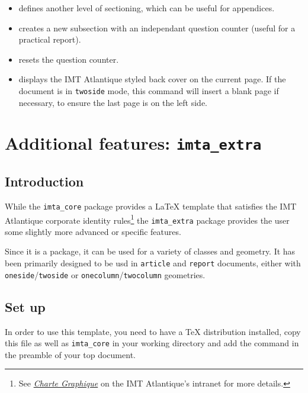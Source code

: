 \documentclass{report}
\begin{document}
\begin{itemize}
    \item {} defines another level of sectioning, which can be useful for appendices.
    
    \item {} creates a new subsection with an independant question counter (useful for a practical report).
    
    \item {} resets the question counter.
    
    \item {} displays the IMT Atlantique styled back cover on the current page. If the document is in \texttt{twoside} mode, this command will insert a blank page if necessary, to ensure the last page is on the left side.
\end{itemize}





\chapter{Additional features: \texttt{imta\_extra}}


\section{Introduction}
While the \texttt{imta\_core} package provides a \LaTeX{} template that satisfies the IMT Atlantique corporate identity rules\footnote{See \textit{\href{https://intranet.imt-atlantique.fr/wp-content/uploads/2017/01/imt_atlantique_chartegraphique.pdf}{Charte Graphique}} on the IMT Atlantique's intranet for more details.} the \texttt{imta\_extra} package provides the user some slightly more advanced or specific features.

Since it is a package, it can be used for a variety of classes and geometry. It has been primarily designed to be usd in \texttt{article} and \texttt{report} documents, either with \texttt{oneside}/\texttt{twoside} or \texttt{onecolumn}/\texttt{twocolumn} geometries.


\section{Set up}
In order to use this template, you need to have a \TeX{} distribution installed, copy this file as well as \texttt{imta\_core} in your working directory and add the  command in the preamble of your top document.
\end{document}
